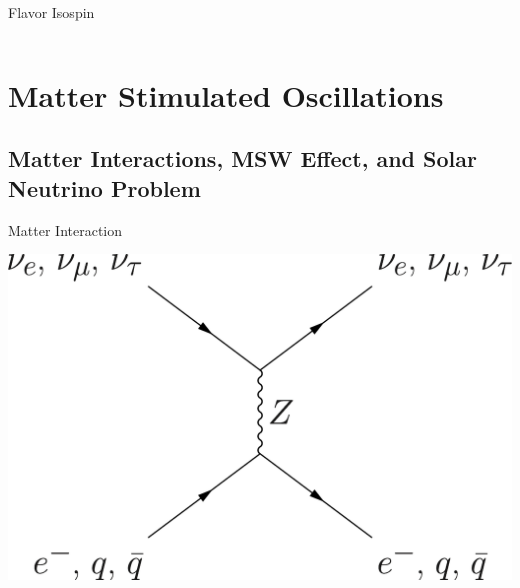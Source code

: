 \documentclass[9pt]{beamer}
\begin{document}
\begin{darkframes}
\begin{frame}{Flavor Isospin}
\begin{columns}[T]
\begin{column}{0.5\textwidth}
\end{column}
\end{columns}




\end{frame}





\section{Matter Stimulated Oscillations}


\subsection{Matter Interactions, MSW Effect, and Solar Neutrino Problem}


\begin{frame}{Matter Interaction}





\begin{tcolorbox}[sidebyside]
\centering
\centering
\includegraphics[height=0.32\textheight]{assets/neutral-current.png}


\end{tcolorbox}
\end{frame}
\end{darkframes}
\end{document}
